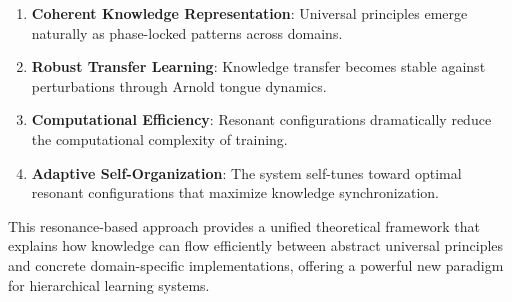 \begin{enumerate}
    \item \textbf{Coherent Knowledge Representation}: Universal principles emerge naturally as phase-locked patterns across domains.
    
    \item \textbf{Robust Transfer Learning}: Knowledge transfer becomes stable against perturbations through Arnold tongue dynamics.
    
    \item \textbf{Computational Efficiency}: Resonant configurations dramatically reduce the computational complexity of training.
    
    \item \textbf{Adaptive Self-Organization}: The system self-tunes toward optimal resonant configurations that maximize knowledge synchronization.
\end{enumerate}

This resonance-based approach provides a unified theoretical framework that explains how knowledge can flow efficiently between abstract universal principles and concrete domain-specific implementations, offering a powerful new paradigm for hierarchical learning systems.